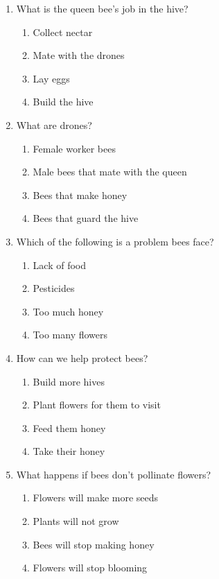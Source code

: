 \documentclass[12pt]{article}
\begin{document}
\begin{enumerate}
\newpage

    \item What is the queen bee's job in the hive?  
    \begin{enumerate}[label=\Alph*.]
        \item Collect nectar  
        \item Mate with the drones  
        \item Lay eggs  
        \item Build the hive
    \end{enumerate}
    \vspace{0.5cm}

    \item What are drones?  
    \begin{enumerate}[label=\Alph*.]
        \item Female worker bees  
        \item Male bees that mate with the queen  
        \item Bees that make honey  
        \item Bees that guard the hive
    \end{enumerate}
    \vspace{0.5cm}

    \item Which of the following is a problem bees face?  
    \begin{enumerate}[label=\Alph*.]
        \item Lack of food  
        \item Pesticides  
        \item Too much honey  
        \item Too many flowers
    \end{enumerate}
    \vspace{0.5cm}

    \item How can we help protect bees?  
    \begin{enumerate}[label=\Alph*.]
        \item Build more hives  
        \item Plant flowers for them to visit  
        \item Feed them honey  
        \item Take their honey
    \end{enumerate}
    \vspace{0.5cm}

    \item What happens if bees don't pollinate flowers?  
    \begin{enumerate}[label=\Alph*.]
        \item Flowers will make more seeds  
        \item Plants will not grow  
        \item Bees will stop making honey  
        \item Flowers will stop blooming
    \end{enumerate}
    \vspace{0.5cm}


\end{enumerate}
\end{document}
